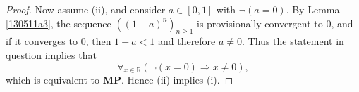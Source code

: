 \documentclass[10pt,a4paper]{amsart}
\begin{document}
\begin{proof}
Now assume (ii), and consider $a\in\left[  0,1\right]  $ with $\lnot\left(
a=0\right)  .$ By Lemma \ref{130511a3}, the sequence $\left(  \left(
1-a\right)  ^{n}\right)  _{n\geqslant1}$ is provisionally convergent to $0$,
and if it converges to $0$, then $1-a<1$ and therefore $a\neq0$. Thus the
statement in question implies that%
\[
\forall_{x\in\mathbb{R}}\left(  \lnot(x=0)\Rightarrow x\neq0\right)  ,
\]
which is equivalent to \textbf{MP}. Hence (ii) implies (i).
\end{proof}%
\end{document}
